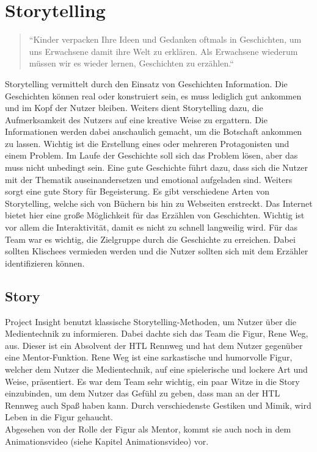 \section{Storytelling} 
\begin{quote}
“Kinder verpacken Ihre Ideen und Gedanken oftmals in Geschichten, um uns Erwachsene damit ihre Welt zu erklären. Als Erwachsene wiederum müssen wir es wieder lernen, Geschichten zu erzählen.“  
\end{quote}
Storytelling vermittelt durch den Einsatz von Geschichten Information. Die Geschichten können real oder konstruiert sein, es muss lediglich gut ankommen und im Kopf der Nutzer bleiben. Weiters dient Storytelling dazu, die Aufmerksamkeit des Nutzers auf eine kreative Weise zu ergattern. Die Informationen werden dabei anschaulich gemacht, um die Botschaft ankommen zu lassen. Wichtig ist die Erstellung eines oder mehreren Protagonisten und einem Problem. Im Laufe der Geschichte soll sich das Problem lösen, aber das muss nicht unbedingt sein. Eine gute Geschichte führt dazu, dass sich die Nutzer mit der Thematik auseinandersetzen und emotional aufgeladen sind. Weiters sorgt eine gute Story für Begeisterung. Es gibt verschiedene Arten von Storytelling, welche sich von Büchern bis hin zu Webseiten erstreckt. Das Internet bietet hier eine große Möglichkeit für das Erzählen von Geschichten. Wichtig ist vor allem die Interaktivität, damit es nicht zu schnell langweilig wird.  Für das Team war es wichtig, die Zielgruppe durch die Geschichte zu erreichen. Dabei sollten Klischees vermieden werden und die Nutzer sollten sich mit dem Erzähler identifizieren können. 
\subsection{Story}
Project Insight benutzt klassische Storytelling-Methoden, um Nutzer über die Medientechnik zu informieren. Dabei dachte sich das Team die Figur, Rene Weg, aus. Dieser ist ein Absolvent der HTL Rennweg und hat dem Nutzer gegenüber eine Mentor-Funktion. Rene Weg ist eine sarkastische und humorvolle Figur, welcher dem Nutzer die Medientechnik, auf eine spielerische und lockere Art und Weise, präsentiert. Es war dem Team sehr wichtig, ein paar Witze in die Story einzubinden, um dem Nutzer das Gefühl zu geben, dass man an der HTL Rennweg auch Spaß haben kann. Durch verschiedenste Gestiken und Mimik, wird Leben in die Figur gehaucht. \leavevmode \\
Abgesehen von der Rolle der Figur als Mentor, kommt sie auch noch in dem Animationsvideo (siehe Kapitel Animationsvideo) vor. 

